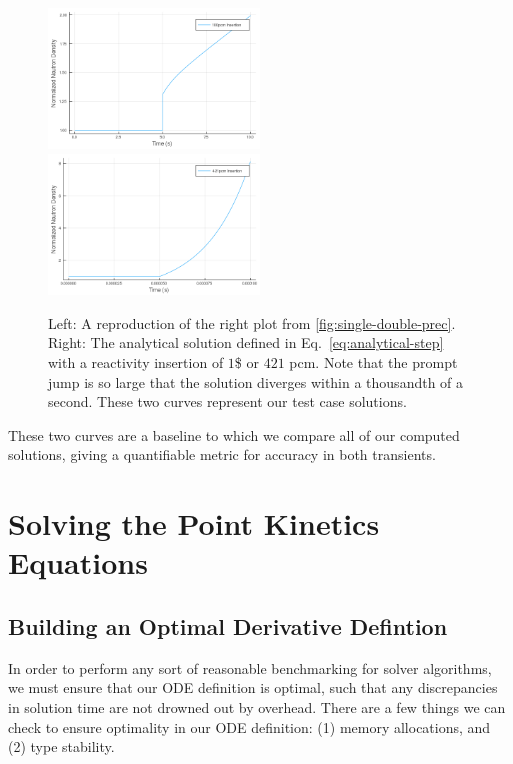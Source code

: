 \documentclass[review,onefignum,onetabnum]{siamart171218}
\begin{document}
\begin{figure}[htb]
  \includegraphics[width=0.5\textwidth]{../plots/analytical-sols/100pcm.png}
  \includegraphics[width=0.5\textwidth]{../plots/analytical-sols/421pcm.png}
  \caption{Left: A reproduction of the right plot from \cref{fig:single-double-prec}.
  Right: The analytical solution defined in Eq.~\cref{eq:analytical-step} with a
  reactivity insertion of $1$\$ or $421$ pcm. Note that the prompt jump is so large that the
  solution diverges within a thousandth of a second. These two curves represent our
  test case solutions.}
  \label{fig:dollar-insert-analytical}
\end{figure}

These two curves are a baseline to which we compare all of our computed solutions,
giving a quantifiable metric for accuracy in both transients.

\section{Solving the Point Kinetics Equations}

\subsection{Building an Optimal Derivative Defintion}
In order to perform any sort of reasonable benchmarking for solver algorithms,
we must ensure that our ODE definition is optimal, such that any discrepancies in
solution time are not drowned out by overhead. There are a few things we can check
to ensure optimality in our ODE definition: (1) memory allocations, and (2) type stability. \\
\end{document}
